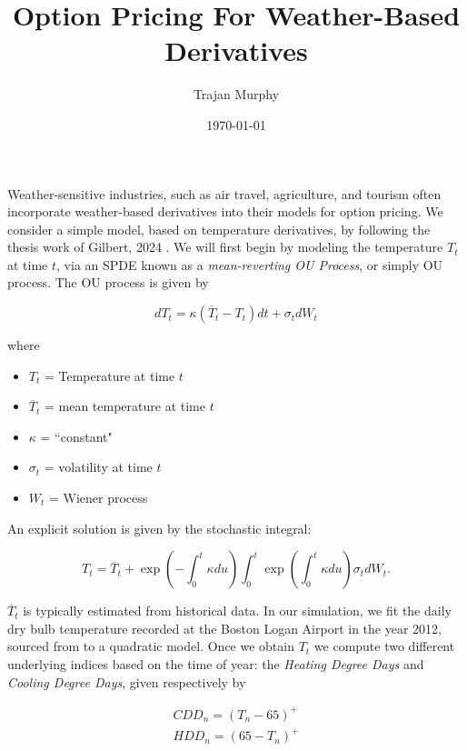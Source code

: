 \documentclass{article}
\title{Option Pricing For Weather-Based Derivatives}
\author{Trajan Murphy}
\date{\today}
\begin{document}
	\maketitle
	
	Weather-sensitive industries, such as air travel, agriculture, and tourism often incorporate weather-based derivatives into their models for option pricing. We consider a simple model, based on temperature derivatives, by following the thesis work of Gilbert, 2024 \cite{gibert2024monte}. We will first begin by modeling the temperature $T_t$ at time $t$, via an SPDE known as a \textit{mean-reverting OU Process}, or simply OU process. The OU process is given by
	
		\begin{equation} \label{Mean-reverting OU-Process}
		dT_t = \kappa(\overline T_t - T_t)dt + \sigma_t dW_t
	\end{equation}
	
	where 
	
	\begin{itemize}
		\item $T_t$ = Temperature at time $t$
		\item $\overline T_t$ = mean temperature at time $t$
		\item $\kappa$ = ``constant"
		\item $\sigma_t$ = volatility at time $t$
		\item $W_t$ = Wiener process
	\end{itemize}
	
	An explicit solution is given by the stochastic integral: 
	
	\begin{equation} \label{Explicit Solution}
		T_t = \overline T_t + \exp \left( -\int_0^t \kappa du \right) \int_0^t \exp \left( \int_0^t \kappa du \right) \sigma_t dW_t.
	\end{equation}
	
	$\overline T_t$ is typically estimated from historical data. In our simulation, we fit the daily dry bulb temperature recorded at the Boston Logan Airport in the year 2012, sourced from \cite{NCEI2026} to a quadratic model. Once we obtain $T_t$ we compute two different underlying indices based on the time of year: the \textit{Heating Degree Days} and \textit{Cooling Degree Days}, given respectively by 
	
	\begin{equation}
		\begin{split}
			CDD_n = (T_n - 65)^+
			\\
			HDD_n = (65 - T_n)^+
		\end{split}
	\end{equation}\\
	
\end{document}
